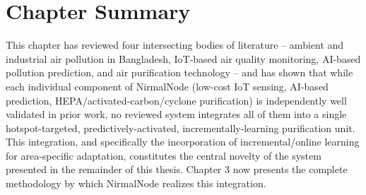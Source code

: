 \section{Chapter Summary}
\label{sec:lr-summary}

This chapter has reviewed four intersecting bodies of literature -- ambient and industrial air pollution in Bangladesh, IoT-based air quality monitoring, AI-based pollution prediction, and air purification technology -- and has shown that while each individual component of NirmalNode (low-cost IoT sensing, AI-based prediction, HEPA/activated-carbon/cyclone purification) is independently well validated in prior work, no reviewed system integrates all of them into a single hotspot-targeted, predictively-activated, incrementally-learning purification unit. This integration, and specifically the incorporation of incremental/online learning for area-specific adaptation, constitutes the central novelty of the system presented in the remainder of this thesis. Chapter 3 now presents the complete methodology by which NirmalNode realizes this integration.
